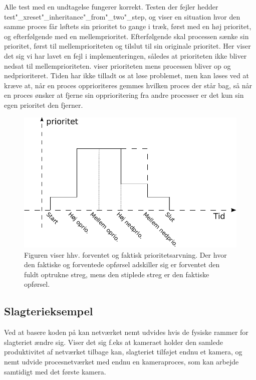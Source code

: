  Alle test med en undtagelse fungerer korrekt. Testen der fejler hedder test"_xreset"_inheritance"_from"_two"_step, og viser en situation hvor den samme proces får løftets sin prioritet to gange i træk, først med en høj prioritet, og efterfølgende med en mellemprioritet. Efterfølgende skal processen sænke sin prioritet, først til  mellemprioriteten og tilslut til sin originale prioritet. Her viser det sig vi har lavet en fejl i implementeringen, således at prioriteten ikke bliver nedsat til mellemprioriteten.  viser prioriteten mens processen bliver op og nedprioriteret. Tiden har ikke tilladt os at løse problemet, men  kan løses ved at kræve at, når en proces opprioriteres gemmes hvilken proces der står bag, så når en proces ønsker at fjerne sin opprioritering fra andre processer er det kun sin egen  prioritet den fjerner.  
 
  
\begin{figure}
 \begin{center}
  \includegraphics[scale=1]{images/priority-inheritance}
	\caption{Figuren viser hhv. forventet og faktisk prioritetsarvning. Der hvor den faktiske og forventede opførsel adskiller sig er forventet den fuldt optrukne streg, mens den stiplede streg er den faktiske opførsel.}
	\label{fig:priority-inheritance}
\end{center}
\end{figure}
  

\subsection{Slagterieksempel}

Ved at basere koden på \pycsp kan netværket nemt udvides hvis de fysiske rammer for slagteriet ændre sig. Viser det sig f.eks at kameraet holder den samlede produktivitet af netværket tilbage kan, slagteriet tilføjet endnu et kamera, og nemt udvide procesnetværket med endnu en kameraproces, som kan arbejde samtidigt med det første kamera. 

